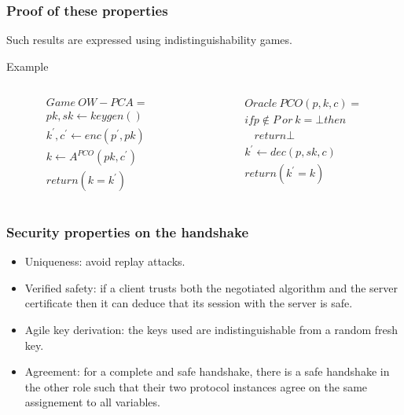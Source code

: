 \documentclass{beamer}
\begin{document}
\begin{frame}
    \frametitle{Proof of these properties}

    Such results are expressed using indistinguishability games.
    
    \begin{block}{Example}
        \begin{columns}[T]
            \begin{column}[T]{.4\textwidth}
                \[\begin{array}{l}
                    Game~OW-PCA =\\
                    pk,sk       \leftarrow keygen()\\
                    k^{'},c^{'} \leftarrow enc(p^{'},pk)\\
                    k           \leftarrow A^{PCO}(pk, c^{'})\\
                    return (k = k^{'})
                \end{array}\]
            \end{column}
            \begin{column}[T]{.4\textwidth}
                \[\begin{array}{l}
                    Oracle~PCO(p,k,c)   =\\
                    if p \not\in P~or~k = \bot then\\
                    ~~~~return \bot\\
                    k^{'}               \leftarrow dec(p,sk,c)\\
                    return (k^{'} = k)
                \end{array}\]
            \end{column}
        \end{columns}
    \end{block}
\end{frame}




\begin{frame}
    \frametitle{Security properties on the handshake}

    \begin{itemize}
        \item Uniqueness: avoid replay attacks.
        \vfill
        \item Verified safety: if a client trusts both the negotiated algorithm and the server certificate then it can deduce that its session with the server is safe.
        \vfill
        \item Agile key derivation: the keys used are indistinguishable from a random fresh key.
        \vfill
        \item Agreement: for a complete and safe handshake, there is a safe handshake in the other role such that their two protocol instances agree on the same assignement to all variables.
    \end{itemize}
\end{frame}
\end{document}
